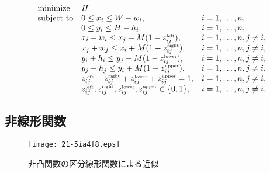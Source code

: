 \documentclass[japanese]{jnlp_1.4}
\begin{document}
\pagebreak
\begin{equation}
\begin{array}{lll}
\textnormal{minimize} & H & \\
\textnormal{subject to} & 0 \le x_i \le W - w_i, & i=1,\dots,n,\\
 & 0 \le y_i \le H - h_i, & i=1,\dots,n,\\
 & x_i + w_i \le x_j + M (1 - z_{ij}^{\textnormal{{\tiny left}}}), & i=1,\dots,n, j \not= i,\\
 & x_j + w_j \le x_i + M (1 - z_{ij}^{\textnormal{{\tiny right}}}), & i=1,\dots,n, j \not= i,\\
 & y_i + h_i \le y_j + M (1 - z_{ij}^{\textnormal{{\tiny lower}}}), & i=1,\dots,n, j \not= i,\\
 & y_j + h_j \le y_i + M (1 - z_{ij}^{\textnormal{{\tiny upper}}}), & i=1,\dots,n, j \not= i,\\
 & z_{ij}^{\textnormal{{\tiny left}}} + z_{ij}^{\textnormal{{\tiny right}}} + z_{ij}^{\textnormal{{\tiny lower}}} + z_{ij}^{\textnormal{{\tiny upper}}} = 1, & i=1,\dots,n, j \not= i,\\
 & z_{ij}^{\textnormal{{\tiny left}}}, z_{ij}^{\textnormal{{\tiny right}}}, z_{ij}^{\textnormal{{\tiny lower}}}, z_{ij}^{\textnormal{{\tiny upper}}} \in \{ 0,1 \}, & i=1,\dots,n, j \not= i.
\end{array}
\end{equation}


\subsection{非線形関数}
\label{sec:nonlinear}

\begin{figure}[b]
\begin{center}
\texttt{[image: 21-5ia4f8.eps]}
\end{center}
\caption{非凸関数の区分線形関数による近似}
\label{fig:nonlinear2}
\end{figure}
\end{document}

